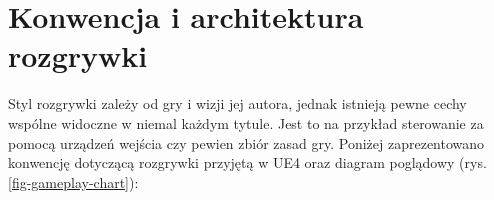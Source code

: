 \documentclass[multip]{SGGW-thesis}
\begin{document}
\section{Konwencja i architektura rozgrywki}
\label{sec:konwencja}
Styl rozgrywki zależy od gry i wizji jej autora, jednak istnieją pewne cechy wspólne widoczne w niemal każdym tytule. Jest to na przykład sterowanie za pomocą urządzeń wejścia czy pewien zbiór zasad gry. Poniżej zaprezentowano konwencję dotyczącą rozgrywki przyjętą w UE4 oraz diagram poglądowy (rys. \ref{fig-gameplay-chart})\cite{docs-gameplay-framework}:
\end{document}
